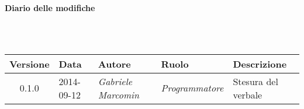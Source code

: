 \noindent\begin{Large}\textbf{Diario delle modifiche}\end{Large}\\
\\
\begin{small}
\begin{tabular}{|c|p{1.8cm}|p{2.8cm}|p{2.8cm}|p{3.5cm}|}
\hline
Versione & Data & Autore & Ruolo & Descrizione \\
\hline
\hline
0.1.0 & 2014-09-12 & 
\textit{Gabriele Marcomin} &
\textit{Programmatore} &  Stesura del verbale\\
\hline
\end{tabular}\\
\end{small}